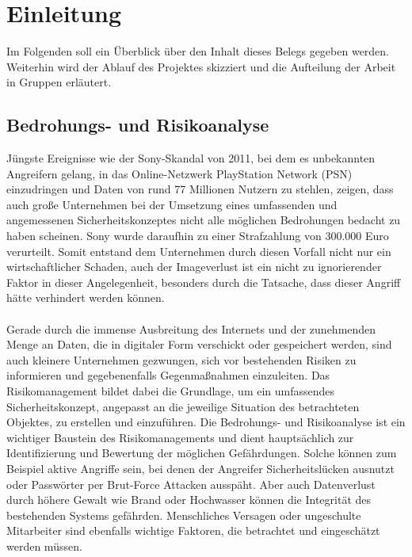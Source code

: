 \section{Einleitung}
Im Folgenden soll ein Überblick über den Inhalt dieses Belegs gegeben werden. Weiterhin wird der Ablauf des Projektes skizziert und die Aufteilung der Arbeit in Gruppen erläutert.

\subsection{Bedrohungs- und Risikoanalyse}
Jüngste Ereignisse wie der Sony-Skandal von 2011, bei dem es unbekannten Angreifern gelang, in das Online-Netzwerk PlayStation Network (PSN) einzudringen und Daten von rund 77 Millionen Nutzern zu stehlen, zeigen, dass auch große Unternehmen bei der Umsetzung eines umfassenden und angemessenen Sicherheitskonzeptes nicht alle möglichen Bedrohungen bedacht zu haben scheinen. Sony wurde daraufhin zu einer Strafzahlung von 300.000 Euro verurteilt\cite{pcwelt:Bergert}. Somit entstand dem Unternehmen durch diesen Vorfall nicht nur ein wirtschaftlicher Schaden, auch der Imageverlust ist ein nicht zu ignorierender Faktor in dieser Angelegenheit, besonders durch die Tatsache, dass dieser Angriff hätte verhindert werden können. 
\\
\\
Gerade durch die immense Ausbreitung des Internets und der zunehmenden Menge an Daten, die in digitaler Form verschickt oder gespeichert werden, sind auch kleinere Unternehmen gezwungen, sich vor bestehenden Risiken zu informieren und gegebenenfalls Gegenmaßnahmen einzuleiten. Das Risikomanagement bildet dabei die Grundlage, um ein umfassendes Sicherheitskonzept, angepasst an die jeweilige Situation des betrachteten Objektes, zu erstellen und einzuführen. Die Bedrohungs- und Risikoanalyse ist ein wichtiger Baustein des Risikomanagements und dient hauptsächlich zur Identifizierung und Bewertung der möglichen Gefährdungen. Solche können zum Beispiel aktive Angriffe sein, bei denen der Angreifer Sicherheitslücken ausnutzt oder Passwörter per Brut-Force Attacken ausspäht. Aber auch Datenverlust durch höhere Gewalt wie Brand oder Hochwasser können die Integrität des bestehenden Systems gefährden. Menschliches Versagen oder ungeschulte Mitarbeiter sind ebenfalls wichtige Faktoren, die betrachtet und eingeschätzt werden müssen.

